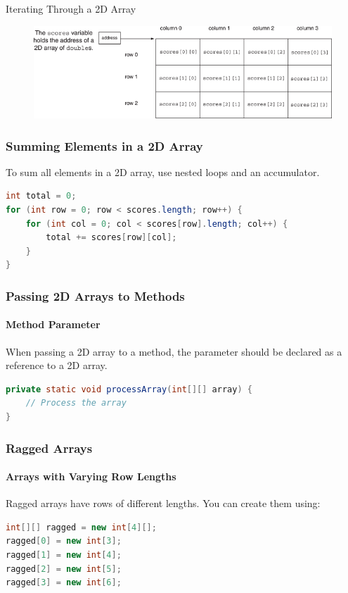 \documentclass[11pt]{beamer}
\begin{document}
\begin{frame}{Iterating Through a 2D Array}
    \noindent 
    \begin{figure}[H]
    \centering
    \includegraphics[scale=0.6]{Images/chapter07_section09_fig20.png}
    \end{figure}       
\end{frame}

\begin{frame}[fragile]
\frametitle{Summing Elements in a 2D Array}

To sum all elements in a 2D array, use nested loops and an accumulator.

\begin{lstlisting}[language=Java]
int total = 0;
for (int row = 0; row < scores.length; row++) {
    for (int col = 0; col < scores[row].length; col++) {
        total += scores[row][col];
    }
}
\end{lstlisting}

\end{frame}

\begin{frame}[fragile]
\frametitle{Passing 2D Arrays to Methods}
\framesubtitle{Method Parameter}

When passing a 2D array to a method, the parameter should be declared as a reference to a 2D array.

\begin{lstlisting}[language=Java]
private static void processArray(int[][] array) {
    // Process the array
}
\end{lstlisting}

\end{frame}

\begin{frame}[fragile]
\frametitle{Ragged Arrays}
\framesubtitle{Arrays with Varying Row Lengths}

Ragged arrays have rows of different lengths. You can create them using:

\begin{lstlisting}[language=Java]
int[][] ragged = new int[4][];
ragged[0] = new int[3];
ragged[1] = new int[4];
ragged[2] = new int[5];
ragged[3] = new int[6];
\end{lstlisting}
\end{frame}
\end{document}

